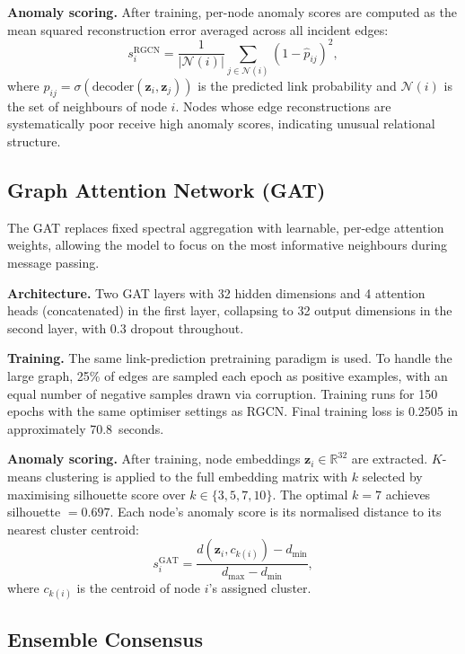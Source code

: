 \documentclass[10pt,twocolumn]{article}
\begin{document}
\textbf{Anomaly scoring.} After training, per-node anomaly scores are computed
as the mean squared reconstruction error averaged across all incident edges:
\begin{equation}
  s_i^{\text{RGCN}} = \frac{1}{|\mathcal{N}(i)|}
    \sum_{j \in \mathcal{N}(i)} (1 - \hat{p}_{ij})^2,
\end{equation}
where $\hat{p}_{ij} = \sigma(\text{decoder}(\mathbf{z}_i, \mathbf{z}_j))$ is
the predicted link probability and $\mathcal{N}(i)$ is the set of neighbours
of node $i$. Nodes whose edge reconstructions are systematically poor receive
high anomaly scores, indicating unusual relational structure.

\subsection{Graph Attention Network (GAT)}

The GAT \cite{velickovic2018graph} replaces fixed spectral aggregation with
learnable, per-edge attention weights, allowing the model to focus on the most
informative neighbours during message passing.

\textbf{Architecture.} Two GAT layers with 32 hidden dimensions and 4 attention
heads (concatenated) in the first layer, collapsing to 32 output dimensions in
the second layer, with 0.3 dropout throughout.

\textbf{Training.} The same link-prediction pretraining paradigm is used. To
handle the large graph, 25\% of edges are sampled each epoch as positive
examples, with an equal number of negative samples drawn via corruption.
Training runs for 150 epochs with the same optimiser settings as RGCN. Final
training loss is 0.2505 in approximately 70.8~seconds.

\textbf{Anomaly scoring.} After training, node embeddings
$\mathbf{z}_i \in \mathbb{R}^{32}$ are extracted. $K$-means clustering is
applied to the full embedding matrix with $k$ selected by maximising silhouette
score over $k \in \{3, 5, 7, 10\}$. The optimal $k = 7$ achieves
silhouette $= 0.697$. Each node's anomaly score is its normalised distance to
its nearest cluster centroid:
\begin{equation}
  s_i^{\text{GAT}} = \frac{d({\mathbf{z}}_i, c_{k(i)}) - d_{\min}}{d_{\max} - d_{\min}},
\end{equation}
where $c_{k(i)}$ is the centroid of node $i$'s assigned cluster.

\subsection{Ensemble Consensus}
\end{document}
